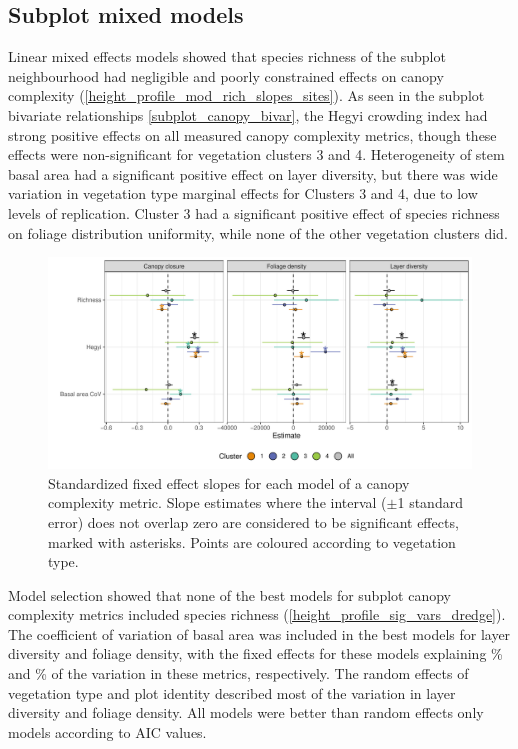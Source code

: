 \documentclass[11pt,a4paper]{article}
\begin{document}
\subsection{Subplot mixed models}

Linear mixed effects models showed that species richness of the subplot neighbourhood had negligible and poorly constrained effects on canopy complexity (\autoref{height_profile_mod_rich_slopes_sites}). As seen in the subplot bivariate relationships \autoref{subplot_canopy_bivar}, the Hegyi crowding index had strong positive effects on all measured canopy complexity metrics, though these effects were non-significant for vegetation clusters 3 and 4. Heterogeneity of stem basal area had a significant positive effect on layer diversity, but there was wide variation in vegetation type marginal effects for Clusters 3 and 4, due to low levels of replication. Cluster 3 had a significant positive effect of species richness on foliage distribution uniformity, while none of the other vegetation clusters did.

\begin{figure}
	\includegraphics[width=\linewidth]{height_profile_mod_rich_slopes_sites}
	\caption{Standardized fixed effect slopes for each model of a canopy complexity metric. Slope estimates where the interval ($\pm$1 standard error) does not overlap zero are considered to be significant effects, marked with asterisks. Points are coloured according to vegetation type.}
	\label{height_profile_mod_rich_slopes_sites}
\end{figure}

Model selection showed that none of the best models for subplot canopy complexity metrics included species richness (\autoref{height_profile_sig_vars_dredge}). The coefficient of variation of basal area was included in the best models for layer diversity and foliage density, with the fixed effects for these models explaining \bestLayerDivRsqS\% and \bestDensRsqS\% of the variation in these metrics, respectively. The random effects of vegetation type and plot identity described most of the variation in layer diversity and foliage density. All models were better than random effects only models according to AIC values.
\end{document}
